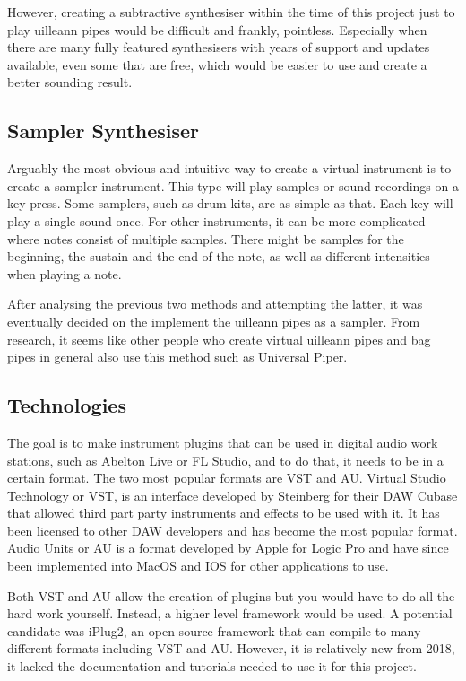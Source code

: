 \documentclass[12pt]{article}
\begin{document}
	However, creating a subtractive synthesiser within the time of this project just to play uilleann pipes would be difficult and
	frankly, pointless. Especially when there are many fully featured synthesisers with years of support and updates available, 
	even some that are free, which would be easier to use and create a better sounding result.
	
	\subsection{Sampler Synthesiser}
	Arguably the most obvious and intuitive way to create a virtual instrument is to create a sampler instrument. This type will
	play samples or sound recordings on a key press. Some samplers, such as drum kits, are as simple as that. Each key will play
	a single sound once. For other instruments, it can be more complicated where notes consist of multiple samples. There
	might be samples for the beginning, the sustain and the end of the note, as well as different intensities when playing a note.
	
	After analysing the previous two methods and attempting the latter, it was eventually decided on the implement the
	uilleann pipes as a sampler. From research, it seems like other people who create virtual uilleann pipes and bag pipes in
	general also use this method such as Universal Piper.
	
	
	\subsection{Technologies}
	The goal is to make instrument plugins that can be used in digital audio work stations, such as Abelton Live or FL Studio,
	and to do that, it needs to be in a certain format. The two most popular formats are VST and AU. Virtual Studio Technology or
	VST, is an interface developed by Steinberg for their DAW Cubase that allowed third part party instruments and effects to be 
	used with it. It has been licensed to other DAW developers and has become the most popular format. 
	Audio Units or AU is a format developed by Apple for Logic Pro and have since been implemented into MacOS and IOS for 
	other applications to use. 
	
	Both VST and AU allow the creation of plugins but you would have to do all the hard work yourself. Instead, a higher level
	framework would be used. A potential candidate was iPlug2, an open source framework that can compile to many different 
	formats including VST and AU. However, it is relatively new from 2018, it lacked the documentation and tutorials needed
	to use it for this project.
	
\end{document}
